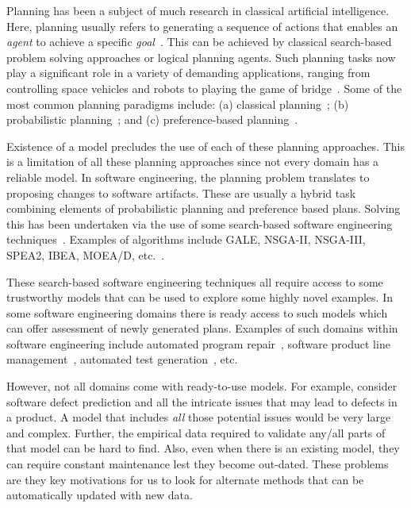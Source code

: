 \documentclass[conference]{IEEEtran}
\begin{document}
Planning  has been a subject of much research in classical artificial intelligence. Here, planning usually refers to generating a sequence of actions that enables an \textit{agent} to achieve a specific \textit{goal}~\cite{norvig}. This can be achieved by classical search-based problem solving  approaches or logical planning agents. Such planning tasks now play a significant role in a variety of demanding applications, ranging from controlling space vehicles and robots to playing the game of bridge~\cite{ghallab04}. Some of the most common planning paradigms include: (a) classical planning~\cite{wooldridge95}; (b) probabilistic planning~\cite{ghallab04, Bel, altman99, guo2009, kaelbling98}; and (c) preference-based planning~\cite{son06, baier09}. 

Existence of a model precludes the use of each of these planning approaches. This is a limitation of all these planning approaches since not every domain has a reliable model. In software engineering, the planning problem translates to proposing changes to software artifacts. These are usually a hybrid task combining elements of probabilistic planning and preference based plans. Solving this has been undertaken via the use of some search-based software engineering techniques~\cite{Harman2009, Harman2011}. Examples of algorithms include GALE, NSGA-II, NSGA-III, SPEA2, IBEA, MOEA/D, etc.~\cite{krall2015gale,deb00a,zit02,zit04, deb14,Cui2005a,zhang07:TEC}.

These search-based software engineering techniques all require access to some trustworthy models that can be used to explore some highly novel examples. In some software engineering domains there is ready access to such models which can offer assessment of newly generated plans. Examples of such domains within software engineering include automated program repair~\cite{Weimer2009, LeGoues2015}, software product line management~\cite{sayyad13, metzger14, henard15}, automated test generation~\cite{me09m,andrews10}, etc.  

However, not all domains come with ready-to-use models. For example, consider software defect prediction and all the intricate issues that may lead to defects in a product. A model that includes {\em all} those potential issues would be very large and complex. Further, the empirical data required to validate any/all parts of that model can be hard to find. Also, even when there is an existing model, they can require constant  maintenance lest they become out-dated. These problems are they key motivations for us to look for alternate methods that can be automatically updated with new data.
\end{document}
